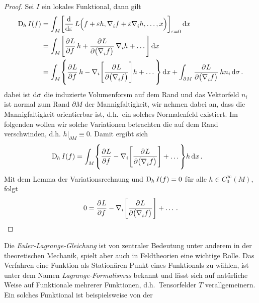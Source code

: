 \begin{proof}
Sei $I$ ein lokales Funktional, dann gilt
\begin{equation}
\begin{split}
\Dif_{\,h} {I}(f)&=\int_M \left[\dod{}{\varepsilon}L\Big(f+\varepsilon
h,\tensor{\nabla}{_i} f+\varepsilon\tensor{\nabla}{_i} h,\dots,x\Big)
\right]_{\varepsilon=0}
\dif x\\
&=\int_M
\left[\dpd{L}{f}h+\dpd{L}{\left(\tensor{\nabla}{_i}f\right)}\nabla_i
h+\dots\right] \dif x\\
&=\int_M
\left\{\dpd{L}{f}h-\nabla_i\left[\dpd{L}{\left(\tensor{\nabla}{_i}f\right)}\right]
h+\dots\right\} \dif x+\int_{\partial
M}\dpd{L}{\left(\tensor{\nabla}{_i}f\right)}h n_i\dif \sigma \,.
\end{split}
\end{equation}
dabei ist $\dif \sigma $ die induzierte Volumenforsm auf dem Rand und
das Vektorfeld $n_i$ ist normal zum Rand
$\partial M$ der Mannigfaltigkeit, wir nehmen dabei an, dass die
Mannigfaltigkeit orientierbar ist, d.h.\ ein solches Normalenfeld existiert.
Im folgenden wollen wir solche Variationen betrachten die auf dem Rand
verschwinden, d.h. $h|_{\partial M}\equiv 0$. Damit ergibt sich
\begin{equation}
\begin{split}
\Dif_{\,h} {I}(f)
&=\int_M
\left\{\dpd{L}{f}-\nabla_i\left[\dpd{L}{\left(\tensor{\nabla}{_i}f\right)}\right]
+\dots\right\}h \dif x \,.
\end{split}
\end{equation}
Mit dem Lemma der Variationsrechnung und $\Dif_{\,h} I(f)=0$ für alle $h\in
C^\infty_0(M)$, folgt
\begin{equation}
0=\dpd{L}{f}-\nabla_i\left[\dpd{L}{\left(\tensor{\nabla}{_i}f\right)}\right]
+\dots\,.
\end{equation}
\end{proof}
Die \emph{Euler-Lagrange-Gleichung} ist von zentraler Bedeutung unter anderem in der theoretischen Mechanik,
spielt aber auch in Feldtheorien eine wichtige Rolle.
Das Verfahren eine Funktion als Stationären Punkt eines Funktionals zu wählen,
ist unter dem Namen \emph{Lagrange-Formalismus} bekannt und lässt sich auf
natürliche Weise auf Funktionale mehrerer Funktionen, d.h.\ Tensorfelder $T$
verallgemeinern.
Ein solches Funktional ist beispielsweise von der
